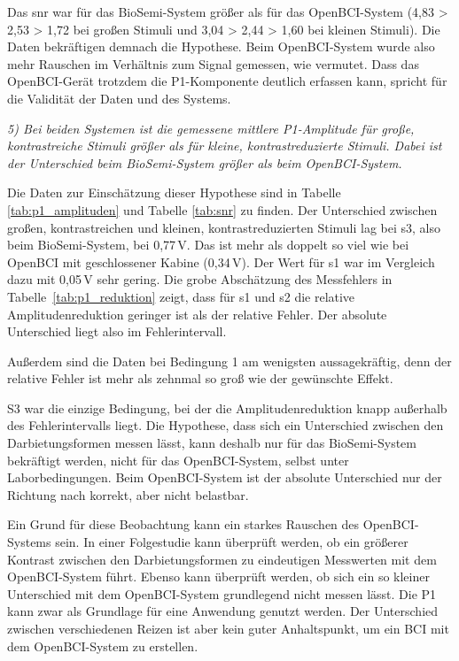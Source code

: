 Das \acrshort{snr} war für das BioSemi-System größer als für das OpenBCI-System (4,83 > 2,53 > 1,72 bei großen Stimuli und 3,04 > 2,44 > 1,60 bei kleinen Stimuli). Die Daten bekräftigen demnach die Hypothese. Beim OpenBCI-System wurde also mehr Rauschen im Verhältnis zum Signal gemessen, wie vermutet. Dass das OpenBCI-Gerät trotzdem die P1-Komponente deutlich erfassen kann, spricht für die Validität der Daten und des Systems.

\textit{5) Bei beiden Systemen ist die gemessene mittlere P1-Amplitude für große, kontrastreiche Stimuli größer als für kleine, kontrastreduzierte Stimuli. Dabei ist der Unterschied beim BioSemi-System größer als beim OpenBCI-System.}

Die Daten zur Einschätzung dieser Hypothese sind in Tabelle \ref{tab:p1_amplituden} und Tabelle \ref{tab:snr} zu finden. Der Unterschied zwischen großen, kontrastreichen und kleinen, kontrastreduzierten Stimuli lag bei s3, also beim BioSemi-System, bei 0,77\,\textmu V. Das ist mehr als doppelt so viel wie bei OpenBCI mit geschlossener Kabine (0,34\,\textmu V). Der Wert für s1 war im Vergleich dazu mit 0,05\,\textmu V sehr gering.
Die grobe Abschätzung des Messfehlers in Tabelle~\ref{tab:p1_reduktion} zeigt, dass für s1 und s2 die relative Amplitudenreduktion geringer ist als der relative Fehler. Der absolute Unterschied liegt also im Fehlerintervall.

Außerdem sind die Daten bei Bedingung 1 am wenigsten aussagekräftig, denn der relative Fehler ist mehr als zehnmal so groß wie der gewünschte Effekt.

S3 war die einzige Bedingung, bei der die Amplitudenreduktion knapp außerhalb des Fehlerintervalls liegt. Die Hypothese, dass sich ein Unterschied zwischen den Darbietungsformen messen lässt, kann deshalb nur für das BioSemi-System bekräftigt werden, nicht für das OpenBCI-System, selbst unter Laborbedingungen. Beim OpenBCI-System ist der absolute Unterschied nur der Richtung nach korrekt, aber nicht belastbar.

Ein Grund für diese Beobachtung kann ein starkes Rauschen des OpenBCI-Systems sein. In einer Folgestudie kann überprüft werden, ob ein größerer Kontrast zwischen den Darbietungsformen zu eindeutigen Messwerten mit dem OpenBCI-System führt. Ebenso kann überprüft werden, ob sich ein so kleiner Unterschied mit dem OpenBCI-System grundlegend nicht messen lässt. Die P1 kann zwar als Grundlage für eine Anwendung genutzt werden. Der Unterschied zwischen verschiedenen Reizen ist aber kein guter Anhaltspunkt, um ein BCI mit dem OpenBCI-System zu erstellen.

